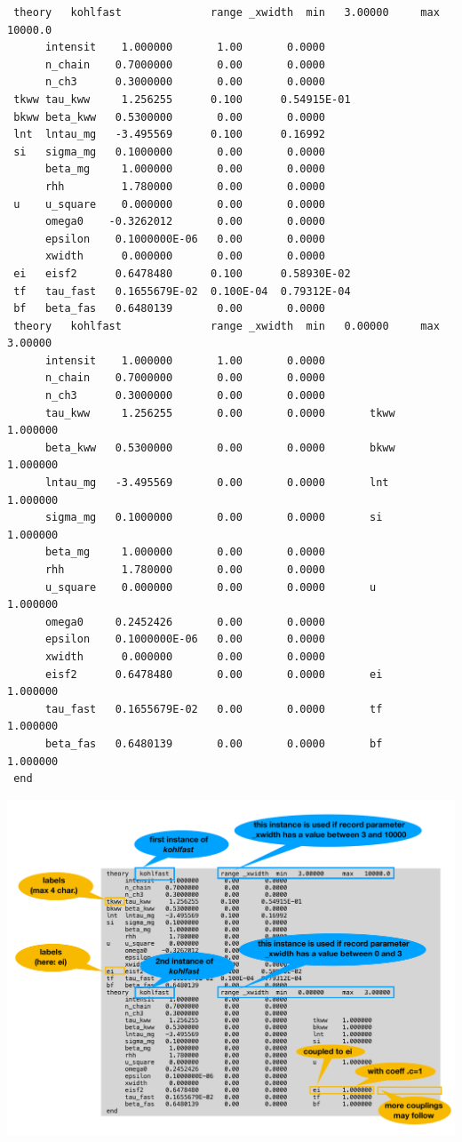 \documentclass[11pt,fleqn]{book} %
\begin{document}
\begin{verbatim}
 theory   kohlfast              range _xwidth  min   3.00000     max   10000.0            
      intensit    1.000000       1.00       0.0000    
      n_chain    0.7000000       0.00       0.0000    
      n_ch3      0.3000000       0.00       0.0000    
 tkww tau_kww     1.256255      0.100      0.54915E-01
 bkww beta_kww   0.5300000       0.00       0.0000    
 lnt  lntau_mg   -3.495569      0.100      0.16992    
 si   sigma_mg   0.1000000       0.00       0.0000    
      beta_mg     1.000000       0.00       0.0000    
      rhh         1.780000       0.00       0.0000    
 u    u_square    0.000000       0.00       0.0000    
      omega0    -0.3262012       0.00       0.0000    
      epsilon    0.1000000E-06   0.00       0.0000    
      xwidth      0.000000       0.00       0.0000    
 ei   eisf2      0.6478480      0.100      0.58930E-02
 tf   tau_fast   0.1655679E-02  0.100E-04  0.79312E-04
 bf   beta_fas   0.6480139       0.00       0.0000    
 theory   kohlfast              range _xwidth  min   0.00000     max   3.00000            
      intensit    1.000000       1.00       0.0000    
      n_chain    0.7000000       0.00       0.0000    
      n_ch3      0.3000000       0.00       0.0000    
      tau_kww     1.256255       0.00       0.0000       tkww    1.000000    
      beta_kww   0.5300000       0.00       0.0000       bkww    1.000000    
      lntau_mg   -3.495569       0.00       0.0000       lnt     1.000000    
      sigma_mg   0.1000000       0.00       0.0000       si      1.000000    
      beta_mg     1.000000       0.00       0.0000    
      rhh         1.780000       0.00       0.0000    
      u_square    0.000000       0.00       0.0000       u       1.000000    
      omega0     0.2452426       0.00       0.0000    
      epsilon    0.1000000E-06   0.00       0.0000    
      xwidth      0.000000       0.00       0.0000    
      eisf2      0.6478480       0.00       0.0000       ei      1.000000    
      tau_fast   0.1655679E-02   0.00       0.0000       tf      1.000000    
      beta_fas   0.6480139       0.00       0.0000       bf      1.000000    
 end
\end{verbatim}
\normalsize

\includegraphics[width=\textwidth]{couplingdiagramm.pdf}
\end{document}
